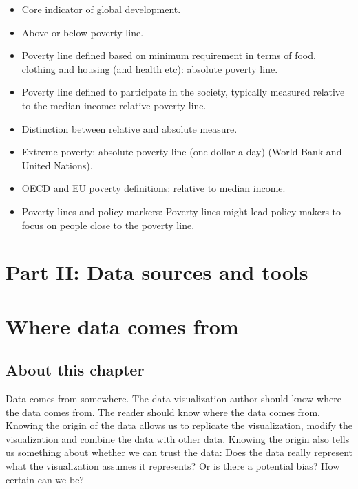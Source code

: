 \documentclass[]{book}
\providecommand{\tightlist}{%
  \setlength{\itemsep}{0pt}\setlength{\parskip}{0pt}}
\begin{document}
\begin{itemize}
\tightlist
\item
  Core indicator of global development.
\item
  Above or below poverty line.
\item
  Poverty line defined based on minimum requirement in terms of food, clothing and housing (and health etc): absolute poverty line.
\item
  Poverty line defined to participate in the society, typically measured relative to the median income: relative poverty line.
\item
  Distinction between relative and absolute measure.
\item
  Extreme poverty: absolute poverty line (one dollar a day) (World Bank and United Nations).
\item
  OECD and EU poverty definitions: relative to median income.
\item
  Poverty lines and policy markers: Poverty lines might lead policy makers to focus on people close to the poverty line.
\end{itemize}

\hypertarget{part-ii-data-sources-and-tools}{%
\chapter*{Part II: Data sources and tools}\label{part-ii-data-sources-and-tools}}

\hypertarget{where-data-comes-from}{%
\chapter{Where data comes from}\label{where-data-comes-from}}

\hypertarget{about-this-chapter-8}{%
\section{About this chapter}\label{about-this-chapter-8}}

Data comes from somewhere. The data visualization author should know where the data comes from. The reader should know where the data comes from. Knowing the origin of the data allows us to replicate the visualization, modify the visualization and combine the data with other data. Knowing the origin also tells us something about whether we can trust the data: Does the data really represent what the visualization assumes it represents? Or is there a potential bias? How certain can we be?
\end{document}
